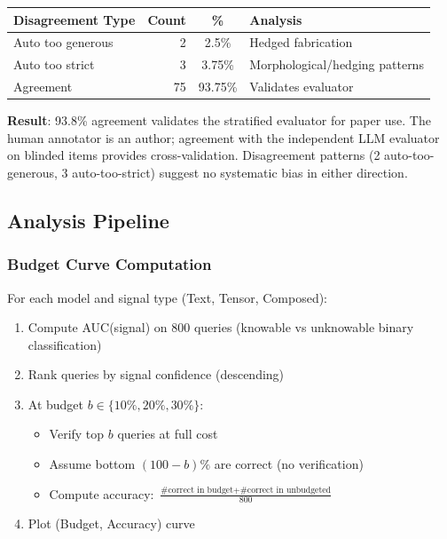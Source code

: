 \documentclass[12pt]{article}
\begin{document}
\begin{table}[H]
\centering
\begin{tabular}{lrcl}
\toprule
\textbf{Disagreement Type} & \textbf{Count} & \textbf{\%} & \textbf{Analysis} \\
\midrule
Auto too generous & 2 & 2.5\% & Hedged fabrication \\
Auto too strict & 3 & 3.75\% & Morphological/hedging patterns \\
Agreement & 75 & 93.75\% & Validates evaluator \\
\bottomrule
\end{tabular}
\end{table}

\textbf{Result}: 93.8\% agreement validates the stratified evaluator for paper use. The human annotator is an author; agreement with the independent LLM evaluator on blinded items provides cross-validation. Disagreement patterns (2 auto-too-generous, 3 auto-too-strict) suggest no systematic bias in either direction.

\subsection{Analysis Pipeline}

\subsubsection{Budget Curve Computation}

For each model and signal type (Text, Tensor, Composed):

\begin{enumerate}
    \item Compute AUC(signal) on 800 queries (knowable vs unknowable binary classification)
    \item Rank queries by signal confidence (descending)
    \item At budget $b \in \{10\%, 20\%, 30\%\}$:
    \begin{itemize}
        \item Verify top $b$ queries at full cost
        \item Assume bottom $(100-b)\%$ are correct (no verification)
        \item Compute accuracy: $\frac{\text{\# correct in budget} + \text{\# correct in unbudgeted}}{800}$
    \end{itemize}
    \item Plot (Budget, Accuracy) curve
\end{enumerate}
\end{document}
